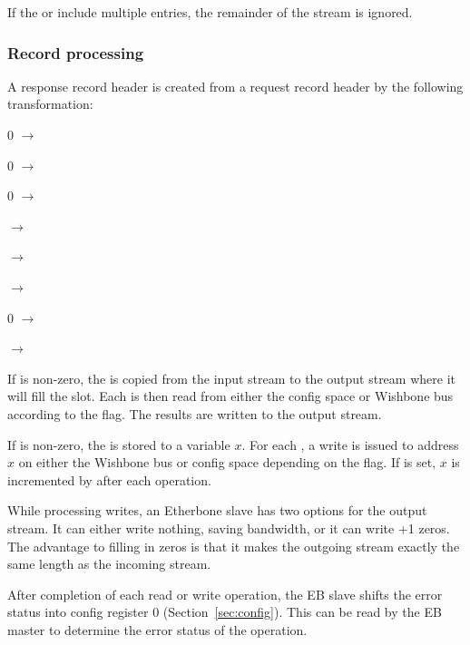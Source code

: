 \documentclass{article}
\newenvironment{packed_itemize}{
\begin{itemize}
  \setlength{\itemsep}{1pt}
  \setlength{\parskip}{0pt}
  \setlength{\parsep}{0pt}
}{\end{itemize}}
\begin{document}
If the  or  include multiple entries, 
the remainder of the stream is ignored.

\subsubsection{Record processing}

A response record header is created from a request record header by the
following transformation:
\begin{packed_itemize}
\item 0 $\to$ 
\item 0 $\to$ 
\item 0 $\to$ 
\item {} $\to$ 
\item {} $\to$ 
\item {} $\to$ 
\item 0 $\to$ 
\item {} $\to$ 
\end{packed_itemize}

If  is non-zero,
the  is copied from the input stream to the
output stream where it will fill the  slot.
Each  is then read from either the config space or
Wishbone bus according to the  flag.
The results are written to the output stream.

If  is non-zero,
the  is stored to a variable $x$.
For each , 
a write is issued to address $x$ on either the Wishbone bus or config space
depending on the  flag.
If  is set, 
$x$ is incremented by  after each operation.

While processing writes,
an Etherbone slave has two options for the output stream.
It can either write nothing, saving bandwidth,
or it can write +1 zeros.
The advantage to filling in zeros is that it makes the outgoing stream exactly
the same length as the incoming stream.

After completion of each read or write operation,
the EB slave shifts the error status into config register 0
(Section~\ref{sec:config}).
This can be read by the EB master to determine the error status of the
operation.
\end{document}

